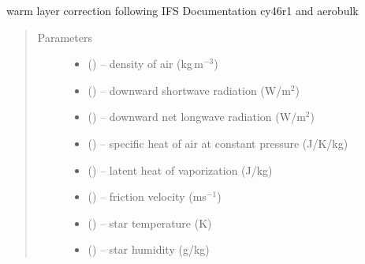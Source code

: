 \documentclass[letterpaper,10pt,english]{sphinxmanual}
\begin{document}
\begin{fulllineitems}
\label{\detokenize{index:cs_wl_subs.wl_ecmwf}}
warm layer correction following IFS Documentation cy46r1 \citep{era5_2019} and aerobulk \citep{Brodeau_etal_2017} 
\begin{quote}\begin{description}
\item[{Parameters}] \leavevmode\begin{itemize}
\item {} 
 (\href{https://docs.python.org/3/library/functions.html\#float}{}) -- density of air (kg\,m$^{-3}$)

\item {} 
 (\href{https://docs.python.org/3/library/functions.html\#float}{}) -- downward shortwave radiation (W/m$^2$)

\item {} 
 (\href{https://docs.python.org/3/library/functions.html\#float}{}) -- downward net longwave radiation (W/m$^2$)

\item {} 
 (\href{https://docs.python.org/3/library/functions.html\#float}{}) -- specific heat of air at constant pressure (J/K/kg)

\item {} 
 (\href{https://docs.python.org/3/library/functions.html\#float}{}) -- latent heat of vaporization (J/kg)

\item {} 
 (\href{https://docs.python.org/3/library/functions.html\#float}{}) -- friction velocity (ms$^{-1}$)

\item {} 
 (\href{https://docs.python.org/3/library/functions.html\#float}{}) -- star temperature (K)

\item {} 
 (\href{https://docs.python.org/3/library/functions.html\#float}{}) -- star humidity (g/kg)


\end{itemize}
\end{description}
\end{quote}
\end{fulllineitems}
\end{document}
